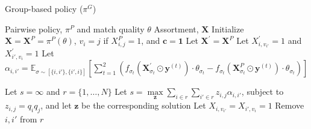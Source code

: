 \begin{algorithm}[h]
   \caption{Group-based policy ($\pi^{G}$)}
\begin{algorithmic}[1]
     Pairwise policy, $\pi^{P}$ and match quality $\theta$
     Assortment, $\mathbf{X}$
    \STATE Initialize $\mathbf{X} = \mathbf{X}^{P} = \pi^{P}(\theta)$, $v_{i}=j$ if $X_{i,j}^{P}=1$, and $\mathbf{c} = \mathbf{1}$
        \STATE Let $\mathbf{X}^{\prime} = \mathbf{X}^{P}$ 
        \STATE Let ${X}^{\prime}_{i,v_{i'}}=1$ and $X^{\prime}_{i',v_{i}}=1$ 
        \STATE Let $\alpha_{i,i'} =\mathbb{E}_{\sigma \sim [\{i,i'\},\{i',i\}]}[\sum_{t=1}^{2} (f_{\sigma_{t}}\left(\mathbf{X}^{\prime}_{\sigma_t} \odot \mathbf{y}^{(t)}\right) \cdot \theta_{\sigma_{t}} - f_{\sigma_{t}}\left(\mathbf{X}^{P}_{\sigma_t} \odot \mathbf{y}^{(t)}\right) \cdot \theta_{\sigma_{t}})]$
    \ENDFOR

    \STATE Let $s=\infty$ and $r=\{1,\ldots,N\}$
        \STATE Let $s = \max\limits_{\mathbf{z}} \sum_{i \in r} \sum_{i' \in r} z_{i,j} \alpha_{i,i'}$, subject to $z_{i,j} = q_{i} q_{j}$, and let $\mathbf{z}$ be the corresponding solution
            \STATE Let $X_{i,v_{i'}}=X_{i',v_{i}}=1$
            \STATE Remove $i,i'$ from $r$ 
        \ENDFOR 
    \ENDWHILE
\end{algorithmic}
\label{alg:grouping}
\end{algorithm}

